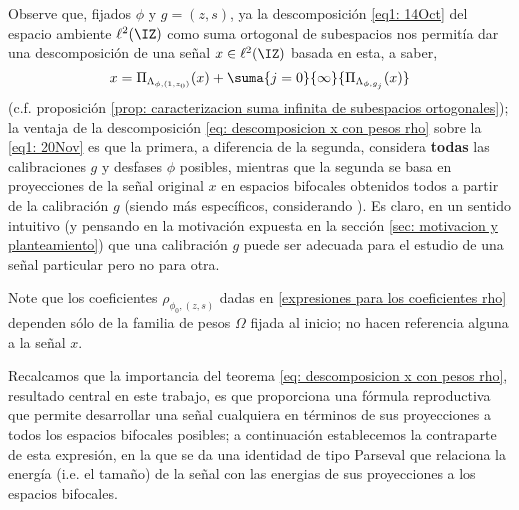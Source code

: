 \begin{nota}
Observe que, fijados $\phi$ y $g=(z,s)$, 
ya la descomposición \eqref{eq1: 14Oct} 
del espacio ambiente $\ell^{2}(\IZ)$ como suma
ortogonal de subespacios nos permitía dar una descomposición
de una señal $x \in \ell^{2}(\IZ)$ basada en esta, a saber,
\begin{equation}
\label{eq1: 20Nov}
x= \Pi_{\Lambda_{\phi, (1, z_{0})}}(x)
+ \suma{j=0}{\infty}{\Pi_{\Lambda_{\phi, g_{j}}}(x)}
\end{equation}
(c.f. proposición
\ref{prop: caracterizacion suma infinita de subespacios ortogonales});
la ventaja de la descomposición
\eqref{eq: descomposicion x con pesos rho}
sobre la \eqref{eq1: 20Nov} es que la primera, a diferencia 
de la segunda, considera \textbf{todas} las calibraciones $g$
y desfases $\phi$ posibles, mientras que 
la segunda se basa en proyecciones de la señal original
$x$ en espacios bifocales obtenidos todos a partir de 
la calibración $g$ (siendo más específicos, considerando
). 
Es claro, en un sentido intuitivo (y pensando en
la motivación expuesta en 
la sección \ref{sec: motivacion y planteamiento})
que
una calibración $g$ puede ser adecuada 
para el 
estudio de una señal particular pero no para otra.
\end{nota}

Note que los coeficientes 
$\rho_{\phi_{0}, (z,s)}$ 
dadas en \ref{expresiones para los coeficientes rho}
dependen sólo de la familia
de pesos $\Omega$ fijada al inicio; no hacen referencia
alguna a la señal $x$.

Recalcamos que
la importancia del teorema \ref{eq: descomposicion x con pesos rho},
resultado central en este trabajo, es que proporciona una
fórmula reproductiva que permite desarrollar
una señal cualquiera en términos de sus
proyecciones a todos los espacios bifocales posibles;
a continuación
establecemos la contraparte de esta expresión, en la que
se da una identidad de tipo Parseval
que relaciona la energía (i.e. el tamaño)
de la señal con las energias de sus proyecciones
a los espacios bifocales.


